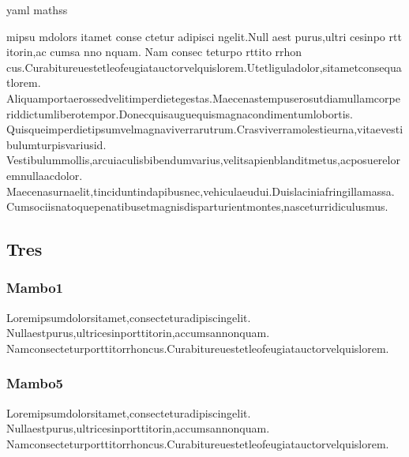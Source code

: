 \documentclass[../main.tex]{subfiles}
\begin{document}
\noindent

\acrshort{yaml}
\Glspl{maths}

mipsu mdolors itamet \parencite{trelloUsers} conse ctetur adipisci ngelit.Null aest purus,ultri cesinpo rtt itorin,ac cumsa nno nquam.
Nam consec teturpo rttito rrhon cus.Curabitureuestetleofeugiatauctorvelquislorem.Utetliguladolor,sitametconsequatlorem.
Aliquamportaerossedvelitimperdietegestas.Maecenastempuserosutdiamullamcorperiddictumliberotempor.Donecquisauguequismagnacondimentumlobortis.
Quisqueimperdietipsumvelmagnaviverrarutrum.Crasviverramolestieurna,vitaevestibulumturpisvariusid.
Vestibulummollis,arcuiaculisbibendumvarius,velitsapienblanditmetus,acposuereloremnullaacdolor.
Maecenasurnaelit,tinciduntindapibusnec,vehiculaeudui.Duislaciniafringillamassa.
Cumsociisnatoquepenatibusetmagnisdisparturientmontes,nasceturridiculusmus.

\subsection{Tres}
    \subsubsection{Mambo1}
        Loremipsumdolorsitamet,consecteturadipiscingelit.
        Nullaestpurus,ultricesinporttitorin,accumsannonquam.
        Namconsecteturporttitorrhoncus.Curabitureuestetleofeugiatauctorvelquislorem.
    
    \subsubsection{Mambo5}
        Loremipsumdolorsitamet,consecteturadipiscingelit.
        Nullaestpurus,ultricesinporttitorin,accumsannonquam.
        Namconsecteturporttitorrhoncus.Curabitureuestetleofeugiatauctorvelquislorem.

\end{document}
